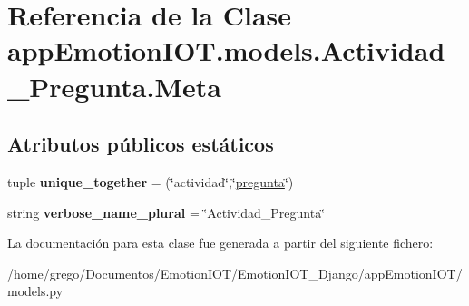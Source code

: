 \hypertarget{classappEmotionIOT_1_1models_1_1Actividad__Pregunta_1_1Meta}{}\section{Referencia de la Clase app\+Emotion\+I\+O\+T.\+models.\+Actividad\+\_\+\+Pregunta.\+Meta}
\label{classappEmotionIOT_1_1models_1_1Actividad__Pregunta_1_1Meta}
\subsection*{Atributos públicos estáticos}
\begin{DoxyCompactItemize}
\item 
tuple {\bfseries unique\+\_\+together} = (\char`\"{}actividad\char`\"{},\char`\"{}\hyperlink{classappEmotionIOT_1_1models_1_1Actividad__Pregunta_a9c096d3ec18da1448fee7ee44f0a96be}{pregunta}\char`\"{})\hypertarget{classappEmotionIOT_1_1models_1_1Actividad__Pregunta_1_1Meta_a5731312f8e832290614a49aa0711ff99}{}\label{classappEmotionIOT_1_1models_1_1Actividad__Pregunta_1_1Meta_a5731312f8e832290614a49aa0711ff99}

\item 
string {\bfseries verbose\+\_\+name\+\_\+plural} = \char`\"{}Actividad\+\_\+\+Pregunta\char`\"{}\hypertarget{classappEmotionIOT_1_1models_1_1Actividad__Pregunta_1_1Meta_a71f1e8359485ae27e8311794a4fe13a0}{}\label{classappEmotionIOT_1_1models_1_1Actividad__Pregunta_1_1Meta_a71f1e8359485ae27e8311794a4fe13a0}

\end{DoxyCompactItemize}


La documentación para esta clase fue generada a partir del siguiente fichero\+:\begin{DoxyCompactItemize}
\item 
/home/grego/\+Documentos/\+Emotion\+I\+O\+T/\+Emotion\+I\+O\+T\+\_\+\+Django/app\+Emotion\+I\+O\+T/models.\+py\end{DoxyCompactItemize}
